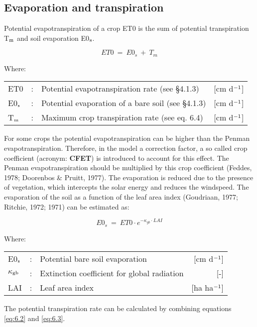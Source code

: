 \subsection{Evaporation and transpiration}
Potential evapotranspiration of a crop ET0 is the sum of potential transpiration T$_{{\rm m}}$ and
soil evaporation E0$_{{\rm s}}$.

\begin{equation}
ET0 ~=~ E0_{s} ~+~ T_{m} 
\end{equation}
 
Where:\\[5pt]
\begin{tabularx}{\textwidth}{llXr}
ET0 &:& Potential evapotranspiration rate (see \S 4.1.3) & [cm d$^{{\rm -1}}$]\\
E0$_{{\rm s}}$ &:& Potential evaporation of a bare soil (see \S 4.1.3)  & [cm d$^{{\rm -1}}$]\\
T$_{{\rm m}}$ &:& Maximum crop transpiration rate (see eq. 6.4)  & [cm d$^{{\rm -1}}$]\\
\end{tabularx}

For some crops the potential evapotranspiration can be higher than the Penman evapotranspiration. 
Therefore, in the model a correction factor, a so called  crop coefficient
(acronym: {\bf CFET}) is introduced to account for this effect. The Penman evapotranspiration
should be multiplied by this crop coefficient (Feddes, 1978; Doorenbos \& Pruitt, 1977).
The evaporation is reduced due to the presence of vegetation, which intercepts the solar
energy and reduces the windspeed. The evaporation of the soil as a function of the leaf
area index (Goudriaan, 1977; Ritchie, 1972; 1971) can be estimated as:

\begin{equation}
E0 _{s} ~=~ ET0 \cdot e^{-\kappa_{gb} \cdot LAI}
\end{equation}

Where:\\[5pt]
\begin{tabularx}{\textwidth}{llXr}
E0$_{{\rm s}}$ &:& Potential bare soil evaporation  & [cm d$^{{\rm -1}}$]\\
 $\kappa$$_{{\rm gb}}$ &:& Extinction coefficient for global radiation  & [-]\\
 LAI &:& Leaf area index  & [ha ha$^{{\rm -1}}$]\\
\end{tabularx}
 
The potential transpiration rate can be calculated by combining equations \ref{eq:6.2} and 
\ref{eq:6.3}.

